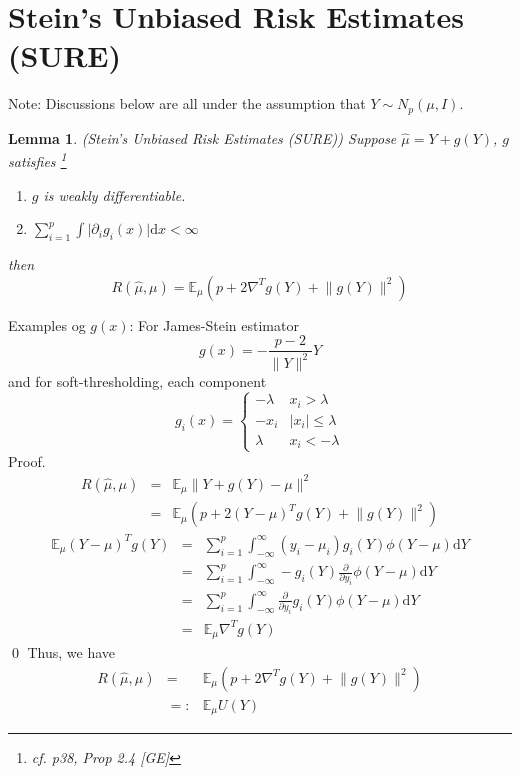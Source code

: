\documentclass[twoside]{article}
\theoremstyle{plain}
\newtheorem{lem}[thm]{Lemma}
\theoremstyle{definition}
\theoremstyle{remark}
\newenvironment{pf}{{\noindent\sc Proof. }}{\qed\newline}
\def\E{{\mathbb E}}
\def\E{{\mathbb E}}
\begin{document}
\section{Stein's Unbiased Risk Estimates (SURE)}
Note: Discussions below are all under the assumption that $Y \sim N_p(\mu, I)$.
\begin{lem}(Stein's Unbiased Risk Estimates (SURE))
	Suppose $\hat{\mu} = Y + g(Y)$, $g$ satisfies
	\footnote{cf. p38, Prop 2.4 [GE]}
	\begin{enumerate}
		\item $g$ is weakly differentiable.
		\item $\sum_{i=1}^p \int \lvert \partial_i g_i(x) \rvert \mathrm{d}x < \infty$
	\end{enumerate}
	then
	\[
		R(\hat{\mu},\mu) = \E_{\mu} ( p + 2\nabla^Tg(Y) + \lVert g(Y) \rVert^2 )
	\]
\end{lem}
Examples og $g(x)$: For James-Stein estimator
\[
	g(x) = - \frac{p-2}{\lVert Y \rVert^2} Y
\]
and for soft-thresholding, each component
\[
	g_i(x) = \left\{\begin{array}{cc}
			-\lambda & x_i > \lambda \\
			-x_i & \lvert x_i \rvert \le \lambda \\
			\lambda & x_i < -\lambda
		\end{array}\right.
\]
\begin{pf}
\begin{eqnarray*}
R(\hat{\mu},\mu) &=& \E_\mu \lVert Y + g(Y) - \mu \rVert^2 \\
&=& \E_\mu \left( p + 2(Y-\mu)^Tg(Y) + \lVert g(Y) \rVert^2 \right)
\end{eqnarray*}
\begin{eqnarray*}
\E_\mu (Y-\mu)^Tg(Y)
&=&\sum_{i=1}^p \int_{-\infty}^{\infty} 
	(y_i-\mu_i)g_i(Y)\phi(Y-\mu)\mathrm{d}Y \\
&=&\sum_{i=1}^p \int_{-\infty}^{\infty}
	-g_i(Y) \frac{\partial}{\partial y_i} \phi(Y-\mu) \mathrm{d}Y \\
&=&\sum_{i=1}^p \int_{-\infty}^{\infty}
	\frac{\partial}{\partial y_i} g_i(Y) \phi(Y-\mu) \mathrm{d}Y \\
&=& \E_\mu \nabla^{T} g(Y)
\end{eqnarray*}
\end{pf}
Thus, we have
\begin{eqnarray*}
	R(\hat{\mu},\mu) &=& \E_\mu (p + 2\nabla^Tg(Y) + \lVert g(Y) \rVert^2 ) \\
					&=:& \E_\mu U(Y)
\end{eqnarray*}
\end{document}
